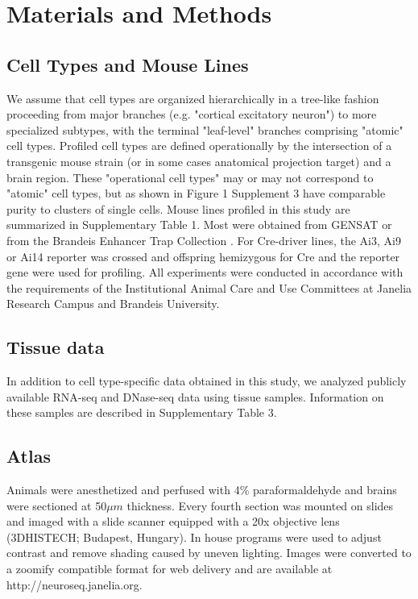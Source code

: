 \section{Materials and Methods}

\subsection{Cell Types and Mouse Lines}
We assume that cell types are organized hierarchically in a tree-like fashion proceeding from major branches (e.g. "cortical excitatory neuron") to more specialized subtypes, with the terminal "leaf-level" branches comprising "atomic" cell types. Profiled cell types are defined operationally by the intersection of a transgenic mouse strain (or in some cases anatomical projection target) and a brain region. These "operational cell types" may or may not correspond to "atomic" cell types, but as shown in Figure 1 Supplement 3 have comparable purity to clusters of single cells. Mouse lines profiled in this study are summarized in Supplementary Table 1. Most were obtained from GENSAT \citep{Gong_2007} or from the Brandeis Enhancer Trap Collection \citep{Shima_2016}. For Cre-driver lines, the Ai3, Ai9 or Ai14 reporter \citep{Madisen_2009} was crossed and offspring hemizygous for Cre and the reporter gene were used for profiling. All experiments were conducted in accordance with the requirements of the Institutional Animal Care and Use Committees at Janelia Research Campus and Brandeis University.

\subsection{Tissue data}
In addition to cell type-specific data obtained in this study, we analyzed publicly available RNA-seq and DNase-seq data using tissue samples. Information on these samples are described in Supplementary Table 3.

\subsection{Atlas}
Animals were anesthetized and perfused with 4\% paraformaldehyde and brains were sectioned at 50$\mu m$ thickness. Every fourth section was mounted on slides and imaged with a slide scanner equipped with a 20x objective lens (3DHISTECH; Budapest, Hungary). In house programs were used to adjust contrast and remove shading caused by uneven lighting. Images were converted to a zoomify compatible format for web delivery and are available at http://neuroseq.janelia.org.


